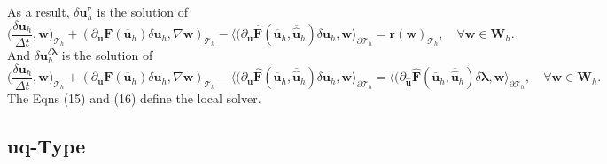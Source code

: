 \documentclass[11pt]{article}
\begin{document}
As a result, $\delta \bm{u}_h^{\bm{r}}$ is the solution of
\begin{equation}
\displaystyle \Big( \frac{\delta \bm{u}_h}{\Delta t}, \bm{w} \Big)_{\mathcal{T}_h} + (\partial_{\bm{u}} \bm{F} (\overline{\bm{u}}_h) \delta \bm{u}_h, \nabla \bm{w})_{\mathcal{T}_h} - \langle (\partial_{\bm{u}} \widehat{\bm{F}} (\overline{\bm{u}}_h, \overline{\widehat{\bm{u}}}_h) \delta \bm{u}_h, \bm{w} \rangle_{\partial \mathcal{T}_h}  =  \bm{r}(\bm{w})_{\mathcal{T}_h},  \quad \forall \bm{w} \in \bm{W}_h.
\end{equation}
And $\delta \bm{u}_h^{\delta \bm{\lambda}}$ is the solution of
\begin{equation}
\displaystyle \Big( \frac{\delta \bm{u}_h}{\Delta t}, \bm{w} \Big)_{\mathcal{T}_h} + (\partial_{\bm{u}} \bm{F} (\overline{\bm{u}}_h) \delta \bm{u}_h, \nabla \bm{w})_{\mathcal{T}_h} - \langle (\partial_{\bm{u}} \widehat{\bm{F}} (\overline{\bm{u}}_h, \overline{\widehat{\bm{u}}}_h) \delta \bm{u}_h, \bm{w} \rangle_{\partial \mathcal{T}_h}  = \langle (\partial_{\widehat{\bm{u}}} \widehat{\bm{F}} (\overline{\bm{u}}_h, \overline{\widehat{\bm{u}}}_h) \delta \bm{\lambda}, \bm{w} \rangle_{\partial \mathcal{T}_h}, \quad \forall \bm{w} \in \bm{W}_h.
\end{equation}
The Eqns (15) and (16) define the local solver.

\subsection{$\bm{uq}$-Type}
\end{document}
